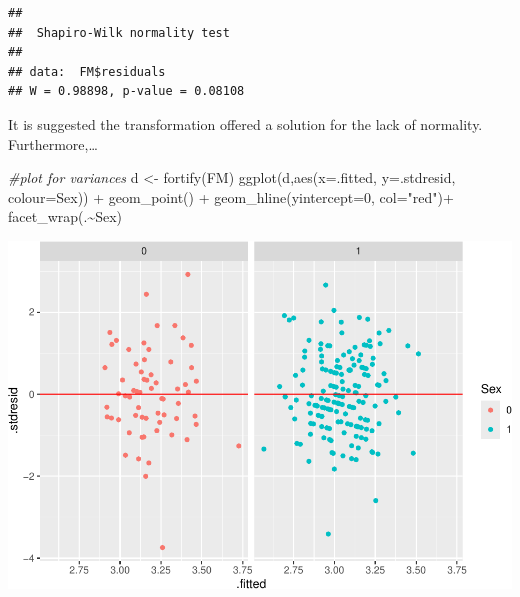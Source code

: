 \documentclass[
]{article}
\newenvironment{Shaded}{\begin{snugshade}}{\end{snugshade}}
\newcommand{\AttributeTok}[1]{\textcolor[rgb]{0.77,0.63,0.00}{#1}}
\newcommand{\CommentTok}[1]{\textcolor[rgb]{0.56,0.35,0.01}{\textit{#1}}}
\newcommand{\DecValTok}[1]{\textcolor[rgb]{0.00,0.00,0.81}{#1}}
\newcommand{\FunctionTok}[1]{\textcolor[rgb]{0.00,0.00,0.00}{#1}}
\newcommand{\NormalTok}[1]{#1}
\newcommand{\OtherTok}[1]{\textcolor[rgb]{0.56,0.35,0.01}{#1}}
\newcommand{\SpecialCharTok}[1]{\textcolor[rgb]{0.00,0.00,0.00}{#1}}
\newcommand{\StringTok}[1]{\textcolor[rgb]{0.31,0.60,0.02}{#1}}
\begin{document}
\begin{Shaded}
\end{Shaded}

\begin{verbatim}
## 
##  Shapiro-Wilk normality test
## 
## data:  FM$residuals
## W = 0.98898, p-value = 0.08108
\end{verbatim}

It is suggested the transformation offered a solution for the lack of
normality. Furthermore,\ldots{}

\begin{Shaded}
\begin{Highlighting}[]
\CommentTok{\#plot for variances}
\NormalTok{d }\OtherTok{\textless{}{-}} \FunctionTok{fortify}\NormalTok{(FM)}
\FunctionTok{ggplot}\NormalTok{(d,}\FunctionTok{aes}\NormalTok{(}\AttributeTok{x=}\NormalTok{.fitted, }\AttributeTok{y=}\NormalTok{.stdresid, }\AttributeTok{colour=}\NormalTok{Sex)) }\SpecialCharTok{+}
  \FunctionTok{geom\_point}\NormalTok{() }\SpecialCharTok{+} 
  \FunctionTok{geom\_hline}\NormalTok{(}\AttributeTok{yintercept=}\DecValTok{0}\NormalTok{, }\AttributeTok{col=}\StringTok{"red"}\NormalTok{)}\SpecialCharTok{+}
  \FunctionTok{facet\_wrap}\NormalTok{(.}\SpecialCharTok{\textasciitilde{}}\NormalTok{Sex)}
\end{Highlighting}
\end{Shaded}

\includegraphics{Real_data_CAPE_Negative_code_files/figure-latex/unnamed-chunk-13-1.pdf}
\end{document}
